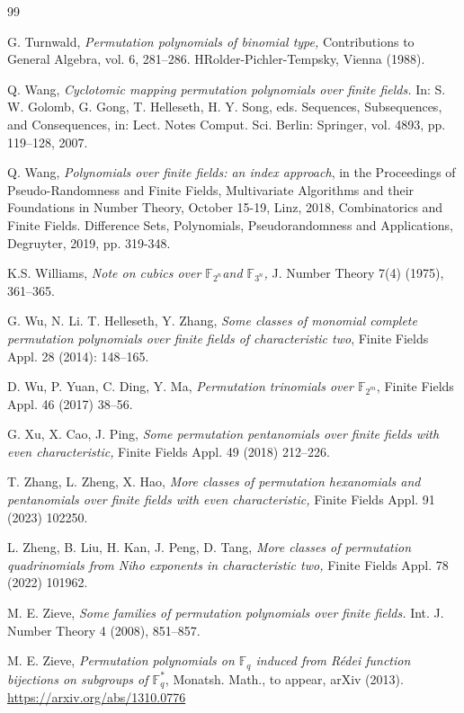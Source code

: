 \documentclass[12pt]{amsart}
\numberwithin{equation}{section}
\theoremstyle{definition}
\newcommand{\F}{\mathbb F}
\begin{document}
\begin{thebibliography}{99}

 G. Turnwald, {\it Permutation polynomials of binomial type,} Contributions to General Algebra, vol. 6, 281--286. HRolder-Pichler-Tempsky, Vienna (1988).

 Q. Wang, {\it Cyclotomic mapping permutation polynomials over finite fields.} In: S. W. Golomb, G. Gong, T. Helleseth, H. Y. Song, eds. Sequences, Subsequences, and Consequences, in: Lect. Notes Comput. Sci. Berlin: Springer, vol. 4893, pp. 119--128, 2007.

 Q. Wang, {\it Polynomials over finite fields: an index approach}, in the Proceedings of Pseudo-Randomness and Finite Fields, Multivariate Algorithms and their Foundations in Number Theory, October 15-19, Linz, 2018, Combinatorics and Finite Fields. Difference Sets, Polynomials, Pseudorandomness and Applications, Degruyter, 2019, pp. 319-348.

 K.S. Williams, {\it Note on cubics over $\F_{2^n}$and $\F_{3^n}$,} J. Number Theory 7(4) (1975), 361--365.

 G. Wu, N. Li. T. Helleseth, Y. Zhang, {\it Some classes of monomial complete permutation polynomials over finite fields of characteristic two}, Finite Fields Appl. 28 (2014): 148--165.

 D. Wu, P. Yuan, C. Ding, Y. Ma,   \textit{Permutation trinomials over $\mathbb{F}_{2^m}$}, Finite Fields Appl. 46 (2017) 38--56.

 G. Xu, X. Cao, J. Ping, {\it Some permutation pentanomials over finite fields with even characteristic,} Finite Fields Appl. 49 (2018) 212--226.

 T. Zhang, L. Zheng, X. Hao, {\it More classes of permutation hexanomials and pentanomials over finite fields with even characteristic,} Finite Fields Appl. 91 (2023) 102250.

 L. Zheng, B. Liu, H. Kan, J. Peng, D. Tang, {\it More classes of permutation quadrinomials from Niho exponents in characteristic two,} Finite Fields Appl. 78 (2022) 101962.

 M. E. Zieve, {\it Some families of permutation polynomials over finite fields.} Int. J. Number Theory 4 (2008), 851--857.

 M. E. Zieve, {\it Permutation polynomials on $\F_q$ induced from R\'edei function bijections on subgroups of $\F_q^*$}, Monatsh. Math., to appear, arXiv (2013). {\url{https://arxiv.org/abs/1310.0776}}
 \end{thebibliography}
 
\end{document}
